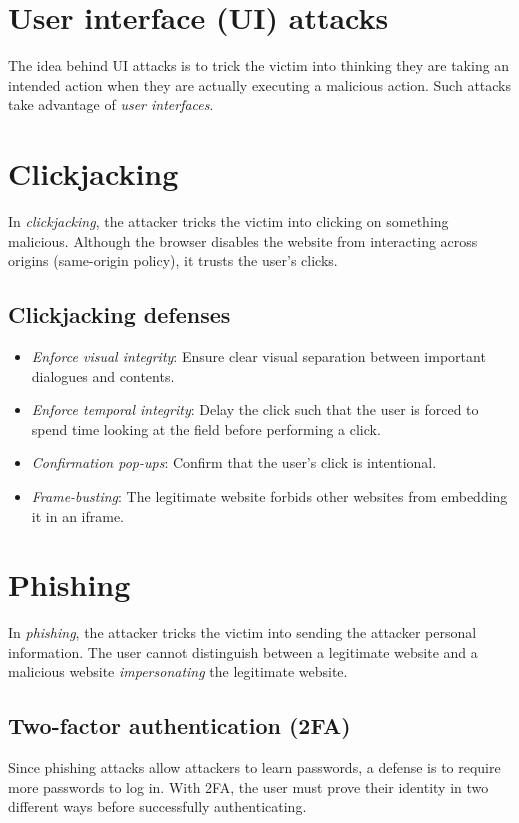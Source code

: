 \section{User interface (UI) attacks}
The idea behind UI attacks is to trick the victim into thinking they are taking an intended action when they are actually executing a malicious action. Such attacks take advantage of \emph{user interfaces}.

\section{Clickjacking}
In \emph{clickjacking}, the attacker tricks the victim into clicking on something malicious. Although the browser disables the website from interacting across origins (same-origin policy), it trusts the user's clicks. 

\subsection{Clickjacking defenses}
\begin{itemize}
    \item \emph{Enforce visual integrity}: Ensure clear visual separation between important dialogues and contents.
    \item \emph{Enforce temporal integrity}: Delay the click such that the user is forced to spend time looking at the field before performing a click.
    \item \emph{Confirmation pop-ups}: Confirm that the user's click is intentional.
    \item \emph{Frame-busting}: The legitimate website forbids other websites from embedding it in an iframe.
\end{itemize}

\section{Phishing}
In \emph{phishing}, the attacker tricks the victim into sending the attacker personal information. The user cannot distinguish between a legitimate website and a malicious website \emph{impersonating} the legitimate website.

\subsection{Two-factor authentication (2FA)}
Since phishing attacks allow attackers to learn passwords, a defense is to require more passwords to log in. With 2FA, the user must prove their identity in two different ways before successfully authenticating.